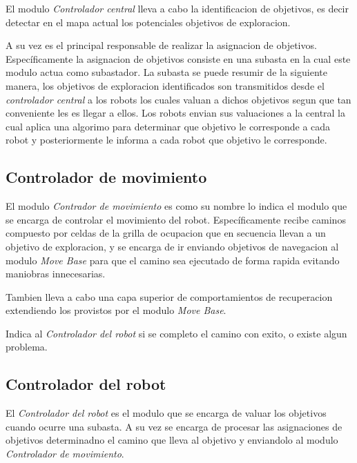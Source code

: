 El modulo \emph{Controlador central} lleva a cabo la identificacion de objetivos, es decir detectar en
el mapa actual los potenciales objetivos de exploracion. 

A su vez es el principal responsable de realizar la asignacion de objetivos.
Específicamente la asignacion de objetivos consiste en una subasta en la cual
este modulo actua como subastador. La subasta se puede resumir de la siguiente
manera, los objetivos de exploracion identificados son transmitidos desde el
\emph{controlador central} a los robots los cuales valuan a dichos objetivos segun que
tan conveniente les es llegar a ellos. Los robots envian sus valuaciones a la
central la cual aplica una algorimo para determinar que objetivo le corresponde
a cada robot y posteriormente le informa a cada robot que objetivo le
corresponde.




\subsection{Controlador de movimiento}
El modulo \emph{Contrador de movimiento} es como su nombre lo indica el modulo
que se encarga de controlar el movimiento del robot. Específicamente recibe
caminos compuesto por celdas de la grilla de ocupacion que en secuencia llevan
a un objetivo de exploracion, y se encarga de ir enviando objetivos de
navegacion al modulo \emph{Move Base} para que el camino sea ejecutado de forma
rapida evitando maniobras innecesarias.

Tambien lleva a cabo una capa superior de comportamientos de recuperacion
extendiendo los provistos por el modulo \emph{Move Base}.

Indica al \emph{Controlador del robot} si se completo el camino con exito, o
existe algun problema.

\subsection{Controlador del robot}
El \emph{Controlador del robot} es el modulo que se encarga de valuar los
objetivos cuando ocurre una subasta. A su vez se encarga de procesar las
asignaciones de objetivos determinadno el camino que lleva al objetivo y
enviandolo al modulo \emph{Controlador de movimiento}. 

